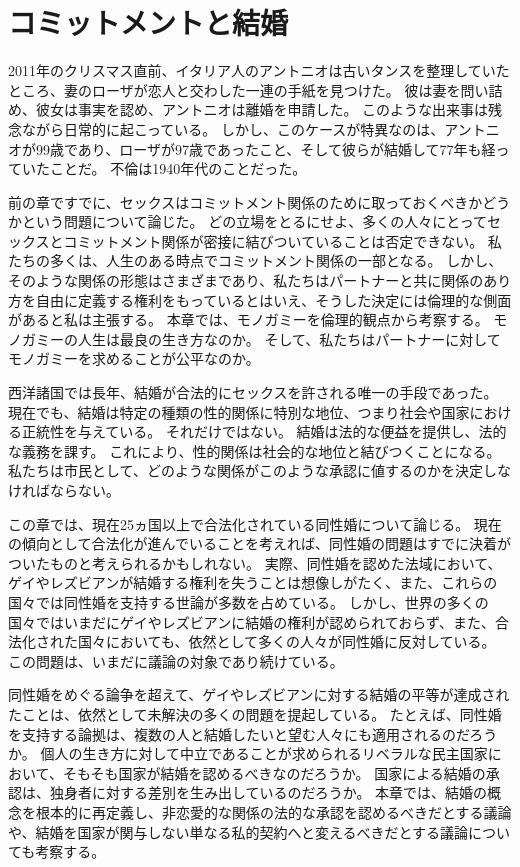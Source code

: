 \documentclass[paper=a4,book,openany]{jlreq}
\begin{document}
\chapter{コミットメントと結婚}

2011年のクリスマス直前、イタリア人のアントニオは古いタンスを整理していたところ、妻のローザが恋人と交わした一連の手紙を見つけた。
彼は妻を問い詰め、彼女は事実を認め、アントニオは離婚を申請した。
このような出来事は残念ながら日常的に起こっている。
しかし、このケースが特異なのは、アントニオが99歳であり、ローザが97歳であったこと、そして彼らが結婚して77年も経っていたことだ。
不倫は1940年代のことだった\citep{squires11:_divor_wife_he_discov_affair}。

前の章ですでに、セックスはコミットメント関係のために取っておくべきかどうかという問題について論じた。
どの立場をとるにせよ、多くの人々にとってセックスとコミットメント関係が密接に結びついていることは否定できない。
私たちの多くは、人生のある時点でコミットメント関係の一部となる。
しかし、そのような関係の形態はさまざまであり、私たちはパートナーと共に関係のあり方を自由に定義する権利をもっているとはいえ、そうした決定には倫理的な側面があると私は主張する。
本章では、モノガミーを倫理的観点から考察する。
モノガミーの人生は最良の生き方なのか。
そして、私たちはパートナーに対してモノガミーを求めることが公平なのか。

西洋諸国では長年、結婚が合法的にセックスを許される唯一の手段であった。
現在でも、結婚は特定の種類の性的関係に特別な地位、つまり社会や国家における正統性を与えている。
それだけではない。
結婚は法的な便益を提供し、法的な義務を課す。
これにより、性的関係は社会的な地位と結びつくことになる。
私たちは市民として、どのような関係がこのような承認に値するのかを決定しなければならない。

この章では、現在25ヵ国以上で合法化されている同性婚について論じる。
現在の傾向として合法化が進んでいることを考えれば、同性婚の問題はすでに決着がついたものと考えられるかもしれない。
実際、同性婚を認めた法域において、ゲイやレズビアンが結婚する権利を失うことは想像しがたく、また、これらの国々では同性婚を支持する世論が多数を占めている。
しかし、世界の多くの国々ではいまだにゲイやレズビアンに結婚の権利が認められておらず、また、合法化された国々においても、依然として多くの人々が同性婚に反対している。
この問題は、いまだに議論の対象であり続けている。

同性婚をめぐる論争を超えて、ゲイやレズビアンに対する結婚の平等が達成されたことは、依然として未解決の多くの問題を提起している。
たとえば、同性婚を支持する論拠は、複数の人と結婚したいと望む人々にも適用されるのだろうか。
個人の生き方に対して中立であることが求められるリベラルな民主国家において、そもそも国家が結婚を認めるべきなのだろうか。
国家による結婚の承認は、独身者に対する差別を生み出しているのだろうか。
本章では、結婚の概念を根本的に再定義し、非恋愛的な関係の法的な承認を認めるべきだとする議論や、結婚を国家が関与しない単なる私的契約へと変えるべきだとする議論についても考察する。
\end{document}
